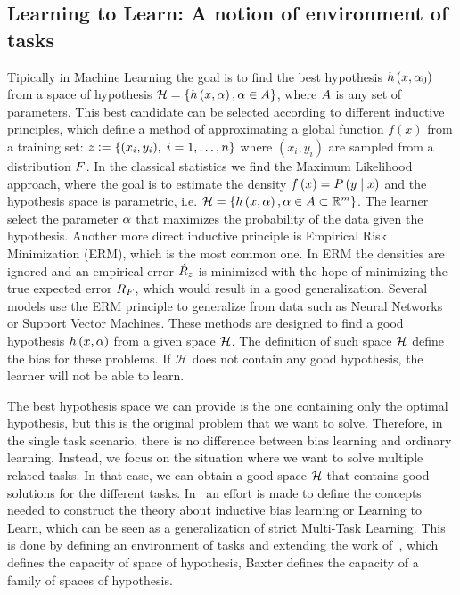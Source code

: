\subsection{Learning to Learn: A notion of environment of tasks} %
Tipically in Machine Learning the goal is to find the best hypothesis $h\left(x, \alpha_0\right)$ from a space of hypothesis $\mathcal{H} = \left\{h\left(x, \alpha\right), \alpha \in A\right\}$, where $A$ is any set of parameters. This best candidate can be selected according to different inductive principles, which define a method of approximating a global function $f(x)$ from a training set:
$ z \vcentcolon= \left\{(x_i, y_i),\; i=1, \ldots, n\right\} $
where $(x_i, y_i)$ are sampled from a distribution $F$.
%
In the classical statistics we find the Maximum Likelihood approach, where the goal is to estimate the density $f\left(x\right) = P\left( y \;\middle\vert\; x \right)$ and the hypothesis space is parametric, i.e. $\mathcal{H} = \left\{h\left(x, \alpha\right), \alpha \in A \subset \mathbb{R}^m\right\}$. The learner select the parameter $\alpha$ that maximizes the probability of the data given the hypothesis.
%
Another more direct inductive principle is Empirical Risk Minimization (ERM), which is the most common one. In ERM the densities are ignored and an empirical error $\hat{R}_z$ is minimized with the hope of minimizing the true expected error $R_F$, which would result in a good generalization. 
%
Several models use the ERM principle to generalize from data such as Neural Networks or Support Vector Machines. These methods are designed to find a good hypothesis $h\left(x, \alpha\right)$ from a given space $\mathcal{H}$. The definition of such space $\mathcal{H}$ define the bias for these problems. If $\mathcal{H}$ does not contain any good hypothesis, the learner will not be able to learn.
%

The best hypothesis space we can provide is the one containing only the optimal hypothesis, but this is the original problem that we want to solve. Therefore, in the single task scenario, there is no difference between bias learning and ordinary learning.
Instead, we focus on the situation where we want to solve multiple related tasks. In that case, we can obtain a good space $\mathcal{H}$ that contains good solutions for the different tasks.
%
In~\cite{baxter2000model} an effort is made to define the concepts needed to construct the theory about inductive bias learning or Learning to Learn, which can be seen as a generalization of strict Multi-Task Learning. This is done by defining an environment of tasks and extending the work of~\cite{vapnik2013nature}, which defines the capacity of space of hypothesis, Baxter defines the capacity of a family of spaces of hypothesis.

